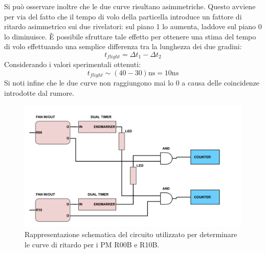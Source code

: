 \documentclass{standalone}
\begin{document}
	Si pu\`o osservare  inoltre che le due curve risultano asimmetriche. Questo avviene per via del fatto che il tempo di volo della particella introduce un fattore di ritardo asimmetrico sui due rivelatori: sul piano 1 lo aumenta, laddove sul piano 0 lo diminuisce. \`E possibile sfruttare tale effetto per ottenere una stima del tempo di volo effettuando una semplice differenza tra la lunghezza dei due gradini:
	\begin{equation}
	t_{flight}=\Delta t_1-\Delta t_2
	\end{equation}
	Considerando i valori sperimentali ottenuti:
	\begin{equation}
    t_{flight} \sim (40-30)\text{ns}=10\text{ns}
	\end{equation}
	Si noti infine che le due curve non raggiungono mai lo 0 a causa delle coincidenze introdotte dal rumore.
	\begin{figure}[H]
		\begin{center}
			\includegraphics[width=1.2\textwidth]{./SCHEMI/RITARDO.png} %
      \caption{\small Rappresentazione schematica del circuito utilizzato per determinare le curve di ritardo per i PM R00B e R10B.}
			\label{fig:circ-delay}
		\end{center}
	\end{figure}
\end{document}
